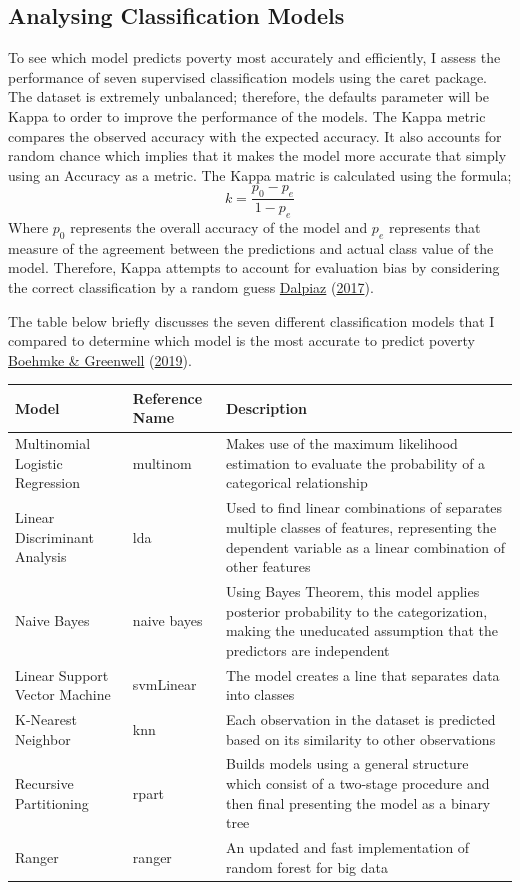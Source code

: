 \documentclass[11pt,preprint, authoryear]{elsarticle}
\numberwithin{equation}{section}
\numberwithin{figure}{section}
\numberwithin{table}{section}
\begin{document}
\hypertarget{analysing-classification-models}{%
\subsection{Analysing Classification
Models}\label{analysing-classification-models}}

To see which model predicts poverty most accurately and efficiently, I
assess the performance of seven supervised classification models using
the caret package. The dataset is extremely unbalanced; therefore, the
defaults parameter will be Kappa to order to improve the performance of
the models. The Kappa metric compares the observed accuracy with the
expected accuracy. It also accounts for random chance which implies that
it makes the model more accurate that simply using an Accuracy as a
metric. The Kappa matric is calculated using the formula;
\[k = \frac{p_0 -p_e}{1-p_e}\] Where \(p_0\) represents the overall
accuracy of the model and \(p_e\) represents that measure of the
agreement between the predictions and actual class value of the model.
Therefore, Kappa attempts to account for evaluation bias by considering
the correct classification by a random guess
\protect\hyperlink{ref-dalpiaz}{Dalpiaz}
(\protect\hyperlink{ref-dalpiaz}{2017}).

The table below briefly discusses the seven different classification
models that I compared to determine which model is the most accurate to
predict poverty \protect\hyperlink{ref-boehmke2019hands}{Boehmke \&
Greenwell} (\protect\hyperlink{ref-boehmke2019hands}{2019}).

\begin{center}
\begin{tabular}{| m{10em} | m{2cm}| m{10cm} |}
\hline
\textbf{Model} & \textbf{Reference Name} & \textbf{Description} \\
\hline
Multinomial Logistic Regression &  multinom & Makes use of the maximum likelihood estimation to evaluate the probability of a categorical relationship \\
\hline
Linear Discriminant Analysis & lda & Used to find linear combinations of separates multiple classes of features, representing the dependent variable as a linear combination of other features \\
\hline
Naive Bayes & naive bayes & Using Bayes Theorem, this model applies posterior probability to the categorization, making the uneducated assumption that the predictors are independent \\
\hline
Linear Support Vector Machine & svmLinear & The model creates a line that separates data into classes \\
\hline
K-Nearest Neighbor & knn & Each observation in the dataset is predicted based on its similarity to other observations \\
\hline
Recursive Partitioning & rpart & Builds models using a general structure which consist of a two-stage procedure and then final presenting the model as a binary tree \\
\hline 
Ranger & ranger & An updated and fast implementation of random forest for big data \\
\hline
\end{tabular}
\end{center}
\end{document}
